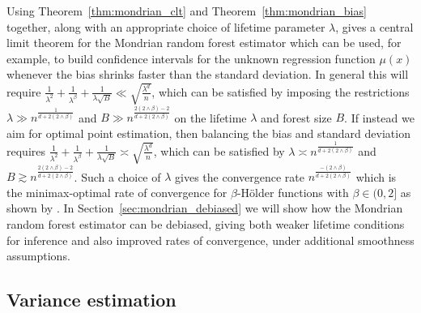 \documentclass[11pt,lof]{puthesis}
\theoremstyle{break}
\theoremstyle{proof}
\begin{document}
Using Theorem~\ref{thm:mondrian_clt} and Theorem~\ref{thm:mondrian_bias}
together,
along with an appropriate choice of lifetime parameter $\lambda$,
gives a central limit theorem for the Mondrian random forest estimator
which can be used, for example, to build confidence intervals
for the unknown regression function $\mu(x)$
whenever the bias shrinks faster than the standard deviation.
In general this will require
$\frac{1}{\lambda^2} + \frac{1}{\lambda^\beta} + \frac{1}{\lambda \sqrt B}
\ll \sqrt{\frac{\lambda^d}{n}}$,
which can be satisfied by imposing the restrictions
$\lambda \gg n^{\frac{1}{d + 2(2 \wedge \beta)}}$
and $B \gg n^{\frac{2(2 \wedge \beta) - 2}{d + 2(2 \wedge \beta)}}$
on the lifetime $\lambda$ and forest size $B$.
If instead we aim for optimal point estimation,
then balancing the bias and standard deviation requires
$\frac{1}{\lambda^2} + \frac{1}{\lambda^\beta} + \frac{1}{\lambda \sqrt B}
\asymp \sqrt{\frac{\lambda^d}{n}}$,
which can be satisfied by
$\lambda \asymp n^{\frac{1}{d + 2(2 \wedge \beta)}}$
and $B \gtrsim n^{\frac{2(2 \wedge \beta) - 2}{d + 2(2 \wedge \beta)}}$.
Such a choice of $\lambda$ gives the convergence rate
$n^{\frac{-(2 \wedge \beta)}{d + 2(2 \wedge \beta)}}$
which is the minimax-optimal rate of convergence \citep{stone1982optimal}
for $\beta$-H{\"o}lder functions with $\beta \in (0,2]$
as shown by \citet[Theorem~2]{mourtada2020minimax}.
In Section~\ref{sec:mondrian_debiased} we will show how the Mondrian random
forest estimator can be debiased, giving both weaker lifetime conditions for
inference and also improved rates of convergence, under additional smoothness
assumptions.

\subsection*{Variance estimation}
\end{document}
